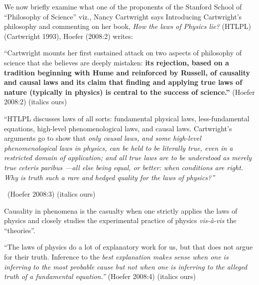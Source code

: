 \vskip 2pt

We now briefly examine what one of the proponents of the Stanford School of “Philosophy of Science” viz., Nancy Cartwright says Introducing Cartwright’s philosophy and commenting on her book, \textit{How the laws of Physics lie?} (HTLPL) (Cartwright 1993), Hoefer (2008:2) writes:

\vskip 2pt

\begin{myquote}
“Cartwright mounts her first sustained attack on two aspects of philosophy of science that she believes are deeply mistaken: \textbf{its rejection, based on a tradition beginning with Hume and reinforced by Russell, of causality and causal laws and its claim that finding and applying true laws of nature (typically in physics) is central to the success of science.”} \hfill (Hoefer 2008:2) (italics ours)
\end{myquote}

\vskip 2pt

\begin{myquote}
“HTLPL discusses laws of all sorts: fundamental physical laws, less-fundamental equations, high-level phenomenological laws, and causal laws. Cartwright’s arguments go to show that \textit{only causal laws, and some high-level phenomenological laws in physics, can be held to be literally true, even in a restricted domain of application; and all true laws are to be understood as merely true ceteris paribus —all else being equal, or better: when conditions are right. Why is truth such a rare and hedged quality for the laws of physics?”} 

~\hfill (Hoefer 2008:3) (italics ours)
\end{myquote}

\vskip 2pt

Causality in phenomena is the casualty when one strictly applies the laws of physics and closely studies the experimental practice of physics \textit{vis-à-vis} the “theories”.

\vskip 2pt

\begin{myquote}
“The laws of physics do a lot of explanatory work for us, but that does not argue for their truth. Inference to the \textit{best explanation makes sense when one is inferring to the most probable cause but not when one is inferring to the alleged truth of a fundamental equation.”} \hfill (Hoefer 2008:4) (italics ours)
\end{myquote}

